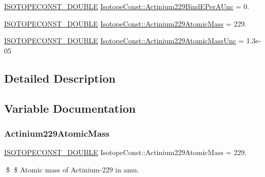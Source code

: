 \begin{DoxyCompactItemize}
\mbox{\hyperlink{group___isotope_const-_macros_ga8f45a7272ce02c0b4c65c44636ed719a}{I\+S\+O\+T\+O\+P\+E\+C\+O\+N\+S\+T\+\_\+\+D\+O\+U\+B\+LE}} \mbox{\hyperlink{group___isotope_const-_actinium-_ac229_ga6f0e4afdf78ebcfb572e1305afcd02a3}{Isotope\+Const\+::\+Actinium229\+Bind\+E\+Per\+A\+Unc}} = 0.
\item 
\mbox{\hyperlink{group___isotope_const-_macros_ga8f45a7272ce02c0b4c65c44636ed719a}{I\+S\+O\+T\+O\+P\+E\+C\+O\+N\+S\+T\+\_\+\+D\+O\+U\+B\+LE}} \mbox{\hyperlink{group___isotope_const-_actinium-_ac229_gacfcace1e7f8317a4911342bf5e150a0e}{Isotope\+Const\+::\+Actinium229\+Atomic\+Mass}} = 229.
\item 
\mbox{\hyperlink{group___isotope_const-_macros_ga8f45a7272ce02c0b4c65c44636ed719a}{I\+S\+O\+T\+O\+P\+E\+C\+O\+N\+S\+T\+\_\+\+D\+O\+U\+B\+LE}} \mbox{\hyperlink{group___isotope_const-_actinium-_ac229_ga03c3f82227e01de5d5ba2746804b0338}{Isotope\+Const\+::\+Actinium229\+Atomic\+Mass\+Unc}} = 1.\+3e-\/05
\end{DoxyCompactItemize}


\subsection{Detailed Description}


\subsection{Variable Documentation}
\mbox{\label{group___isotope_const-_actinium-_ac229_gacfcace1e7f8317a4911342bf5e150a0e}} 
\subsubsection{\texorpdfstring{Actinium229\+Atomic\+Mass}{Actinium229AtomicMass}}
{\footnotesize\ttfamily \mbox{\hyperlink{group___isotope_const-_macros_ga8f45a7272ce02c0b4c65c44636ed719a}{I\+S\+O\+T\+O\+P\+E\+C\+O\+N\+S\+T\+\_\+\+D\+O\+U\+B\+LE}} Isotope\+Const\+::\+Actinium229\+Atomic\+Mass = 229.}

\$ \$ Atomic mass of Actinium-\/229 in amu. \mbox{\label{group___isotope_const-_actinium-_ac229_ga03c3f82227e01de5d5ba2746804b0338}} 
